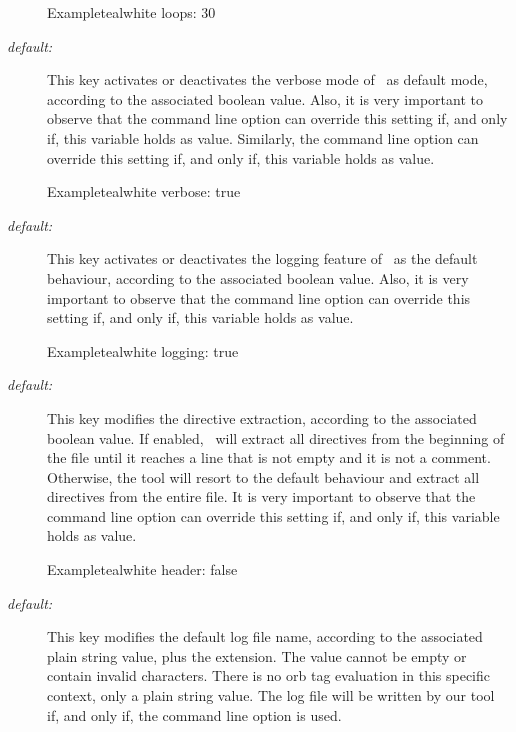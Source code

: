 \begin{description}
\begin{codebox}{Example}{teal}{\icnote}{white}
loops: 30
\end{codebox}

\item[\describecf{O}{boolean}{verbose}\hfill {\normalfont\itshape default:} \rbox{false}] This key activates or deactivates the verbose mode of \arara\ as default mode, according to the associated boolean value. Also, it is very important to observe that the  command line option can override this setting if, and only if, this variable holds  as value. Similarly, the  command line option can override this setting if, and only if, this variable holds  as value.

\begin{codebox}{Example}{teal}{\icnote}{white}
verbose: true
\end{codebox}

\item[\describecf{O}{boolean}{logging}\hfill {\normalfont\itshape default:} \rbox{false}] This key activates or deactivates the logging feature of \arara\ as the default behaviour, according to the associated boolean value. Also, it is very important to observe that the  command line option can override this setting if, and only if, this variable holds  as value.

\begin{codebox}{Example}{teal}{\icnote}{white}
logging: true
\end{codebox}

\item[\describecf{O}{boolean}{header}\hfill {\normalfont\itshape default:} \rbox{false}] This key modifies the directive extraction, according to the associated boolean value. If enabled, \arara\ will extract all directives from the beginning of the file until it reaches a line that is not empty and it is not a comment. Otherwise, the tool will resort to the default behaviour and extract all directives from the entire file. It is very important to observe that the  command line option can override this setting if, and only if, this variable holds  as value.

\begin{codebox}{Example}{teal}{\icnote}{white}
header: false
\end{codebox}

\item[\describecf{O}{string}{logname}\hfill {\normalfont\itshape default:} \rbox{arara}] This key modifies the default log file name, according to the associated plain string value, plus the  extension. The value cannot be empty or contain invalid characters. There is no orb tag evaluation in this specific context, only a plain string value. The log file will be written by our tool if, and only if, the  command line option is used.


\end{description}
